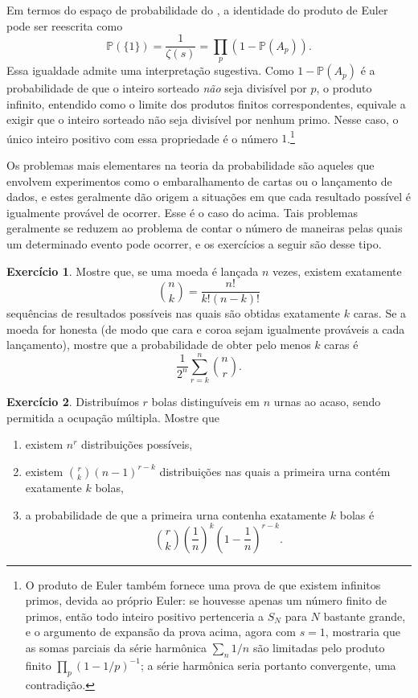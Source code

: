 \documentclass[12pt,portuguese]{article}
\theoremstyle{definition}
\newtheorem{exercise}{Exercício}
\begin{document}
Em termos do espaço de probabilidade do , a identidade do
produto de Euler pode ser reescrita como
\[
\mathbb{P}(\{1\}) = \frac{1}{\zeta(s)}
= \prod_{p} \left(1 - \mathbb{P}(A_p)\right).
\]
Essa igualdade admite uma interpretação sugestiva. Como
\(1 - \mathbb{P}(A_p)\) é a probabilidade de que o inteiro sorteado
\emph{não} seja divisível por \(p\), o produto infinito, entendido como o
limite dos produtos finitos correspondentes, equivale a exigir que o inteiro
sorteado não seja divisível por nenhum primo. Nesse caso, o único inteiro
positivo com essa propriedade é o número \(1\).\footnote{O produto
de Euler também fornece uma prova de que existem infinitos primos, devida
ao próprio Euler: se houvesse apenas um número finito de primos, então todo
inteiro positivo pertenceria a \(S_N\) para \(N\) bastante grande, e o
argumento de expansão da prova acima, agora com \(s = 1\), mostraria que as
somas parciais da série harmônica \(\sum_n 1/n\) são limitadas pelo produto
finito \(\prod_p (1 - 1/p)^{-1}\); a série harmônica seria portanto
convergente, uma contradição.}

Os problemas mais elementares na teoria da probabilidade são aqueles que
envolvem experimentos como o embaralhamento de cartas ou o lançamento de dados,
e estes geralmente dão origem a situações em que cada resultado possível é
igualmente provável de ocorrer. Esse é o caso do  acima. Tais
problemas geralmente se reduzem ao problema de contar o número de maneiras
pelas quais um determinado evento pode ocorrer, e os exercícios a seguir são
desse tipo.

\begin{exercise}\label{exercise:1.25}
Mostre que, se uma moeda é lançada \(n\) vezes, existem exatamente
\[
\binom{n}{k} = \frac{n!}{k!(n-k)!}
\]
sequências de resultados possíveis nas quais são obtidas exatamente \(k\) caras.
Se a moeda for honesta (de modo que cara e coroa sejam igualmente prováveis a cada lançamento),
mostre que a probabilidade de obter pelo menos \(k\) caras é
\[
\frac{1}{2^n} \sum_{r=k}^{n} \binom{n}{r}.
\]
\end{exercise}

\begin{exercise}\label{exercise:1.26}
Distribuímos \(r\) bolas distinguíveis em \(n\) urnas ao acaso, sendo
permitida a ocupação múltipla. Mostre que
\begin{enumerate}[label=(\alph*), ref=\alph*]
\item existem \(n^r\) distribuições possíveis,
\item existem \(\binom{r}{k}(n-1)^{r-k}\) distribuições nas quais a
primeira urna contém exatamente \(k\) bolas,
\item a probabilidade de que a primeira urna contenha exatamente \(k\) bolas é
\[
\binom{r}{k} \left(\frac{1}{n}\right)^k \left(1 -
\frac{1}{n}\right)^{r-k}.
\]
\end{enumerate}
\end{exercise}
\end{document}
